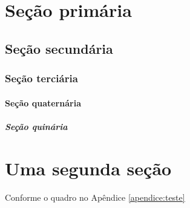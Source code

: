 \documentclass[
    12pt, %
    oneside,
    a4paper,
    english,
    brazil
]{report}
\newcounter{apendice}
\newcounter{anexo}
\begin{document}
\justify
\onehalfspacing

\tableofcontents

\setlength\parindent{1.25cm} %
\setlength{\parskip}{1.241pt} %

\begingroup
  \chapter{Seção primária}
  \lipsum[1-1]

  \section{Seção secundária}
  \lipsum[2-4]

  \subsection{Seção terciária}
  \lipsum[3-3]

  \subsubsection{Seção quaternária}
  \lipsum[4-4]

  \paragraph{Seção quinária} %
  \lipsum[5-5]
\endgroup

\begingroup
  \chapter{Uma segunda seção}

  Conforme o quadro no Apêndice \ref{apendice:teste}

\endgroup

\begingroup
{}\label{apendice:teste}
\lipsum[6-7]
\endgroup

\begingroup 
{}\label{anexo:teste}
\lipsum[6-7]
\endgroup
\end{document}
